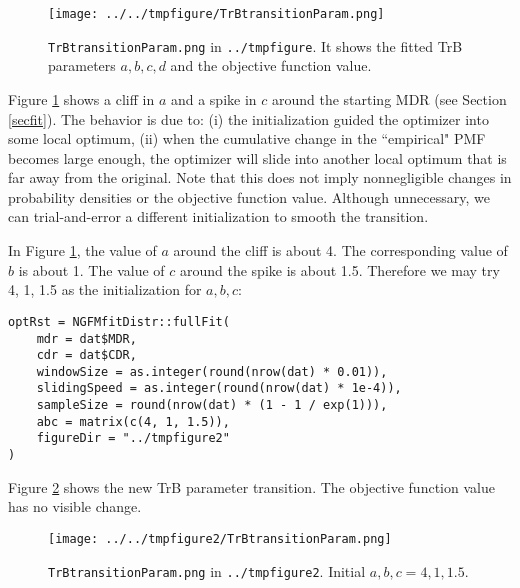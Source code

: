 \documentclass[12pt,letterpaper]{article}
\begin{document}
\begin{figure}[h!] 
\texttt{[image: ../../tmpfigure/TrBtransitionParam.png]}
\caption{\texttt{TrBtransitionParam.png} in \texttt{../tmpfigure}. It shows the fitted TrB parameters $a,b,c,d$ and the objective function value.}\label{trbparplot} 
\end{figure}

Figure \ref{trbparplot} shows a cliff in $a$ and a spike in $c$ around the starting MDR (see Section \ref{secfit}). The behavior is due to: (i) the initialization guided the optimizer into some local optimum, (ii) when the cumulative change in the ``empirical" PMF becomes large enough, the optimizer will slide into another local optimum that is far away from the original. Note that this does not imply nonnegligible changes in probability densities or the objective function value. Although unnecessary, we can trial-and-error a different initialization to smooth the transition.

In Figure \ref{trbparplot}, the value of $a$ around the cliff is about 4. The corresponding value of $b$ is about 1. The value of $c$ around the spike is about 1.5. Therefore we may try 4, 1, 1.5 as the initialization for $a,b,c$:
\begin{verbatim}
optRst = NGFMfitDistr::fullFit(
	mdr = dat$MDR,
	cdr = dat$CDR,
	windowSize = as.integer(round(nrow(dat) * 0.01)),
	slidingSpeed = as.integer(round(nrow(dat) * 1e-4)),
	sampleSize = round(nrow(dat) * (1 - 1 / exp(1))),
	abc = matrix(c(4, 1, 1.5)),
	figureDir = "../tmpfigure2"
)
\end{verbatim}
Figure \ref{trbparplot2} shows the new TrB parameter transition. The objective function value has no visible change.
\begin{figure}[h!] 
\texttt{[image: ../../tmpfigure2/TrBtransitionParam.png]}
\caption{\texttt{TrBtransitionParam.png} in \texttt{../tmpfigure2}. Initial $a,b,c=4,1,1.5$.}\label{trbparplot2} 
\end{figure}
\end{document}
